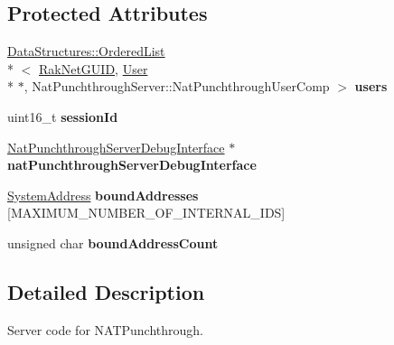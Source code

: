 \subsection*{Protected Attributes}
\begin{DoxyCompactItemize}
\item 
\hypertarget{class_rak_net_1_1_nat_punchthrough_server_ab8aab1b51aea0b554c144b66cfe54973}{\hyperlink{class_data_structures_1_1_ordered_list}{Data\-Structures\-::\-Ordered\-List}\\*
$<$ \hyperlink{struct_rak_net_1_1_rak_net_g_u_i_d}{Rak\-Net\-G\-U\-I\-D}, \hyperlink{struct_rak_net_1_1_nat_punchthrough_server_1_1_user}{User} \\*
$\ast$, Nat\-Punchthrough\-Server\-::\-Nat\-Punchthrough\-User\-Comp $>$ {\bfseries users}}\label{class_rak_net_1_1_nat_punchthrough_server_ab8aab1b51aea0b554c144b66cfe54973}

\item 
\hypertarget{class_rak_net_1_1_nat_punchthrough_server_ab98a6180bd74a9c1e746d5b3a2811fe2}{uint16\-\_\-t {\bfseries session\-Id}}\label{class_rak_net_1_1_nat_punchthrough_server_ab98a6180bd74a9c1e746d5b3a2811fe2}

\item 
\hypertarget{class_rak_net_1_1_nat_punchthrough_server_a630a63b65da2ca14923554bfe6dad61a}{\hyperlink{struct_rak_net_1_1_nat_punchthrough_server_debug_interface}{Nat\-Punchthrough\-Server\-Debug\-Interface} $\ast$ {\bfseries nat\-Punchthrough\-Server\-Debug\-Interface}}\label{class_rak_net_1_1_nat_punchthrough_server_a630a63b65da2ca14923554bfe6dad61a}

\item 
\hypertarget{class_rak_net_1_1_nat_punchthrough_server_a3cffb3474a1bdeb9c2892801e1023109}{\hyperlink{struct_rak_net_1_1_system_address}{System\-Address} {\bfseries bound\-Addresses} \mbox{[}M\-A\-X\-I\-M\-U\-M\-\_\-\-N\-U\-M\-B\-E\-R\-\_\-\-O\-F\-\_\-\-I\-N\-T\-E\-R\-N\-A\-L\-\_\-\-I\-D\-S\mbox{]}}\label{class_rak_net_1_1_nat_punchthrough_server_a3cffb3474a1bdeb9c2892801e1023109}

\item 
\hypertarget{class_rak_net_1_1_nat_punchthrough_server_a6db4ae3a17f404106857e204ba9484f6}{unsigned char {\bfseries bound\-Address\-Count}}\label{class_rak_net_1_1_nat_punchthrough_server_a6db4ae3a17f404106857e204ba9484f6}

\end{DoxyCompactItemize}


\subsection{Detailed Description}
Server code for N\-A\-T\-Punchthrough. 

